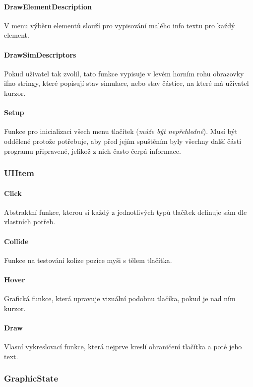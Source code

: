 \documentclass[a4paper, 12pt]{article}
\begin{document}
\paragraph{DrawElementDescription}
V menu výběru elementů slouží pro vypisování malého info textu pro každý
element.

\paragraph{DrawSimDescriptors}
Pokud uživatel tak zvolil, tato funkce vypisuje v levém horním rohu obrazovky
ifno stringy, které popisují stav simulace, nebo stav částice, na které má
uživatel kurzor.

\paragraph{Setup}
Funkce pro inicializaci všech menu tlačítek (\emph{může být nepřehledné}).
Musí být oddělené protože potřebuje, aby před jejím spuštěním byly všechny
další části programu připravené, jelikož z nich často čerpá informace.

\subsubsection{UIItem}
\paragraph{Click}
Abstraktní funkce, kterou si každý z jednotlivých typů tlačítek definuje sám
dle vlastních potřeb.

\paragraph{Collide}
Funkce na testování kolize pozice myši s tělem tlačítka.

\paragraph{Hover}
Grafická funkce, která upravuje vizuální podobnu tlačíka, pokud je nad ním
kurzor.

\paragraph{Draw}
Vlasní vykreslovací funkce, která nejprve kreslí ohraničení tlačítka a poté
jeho text.

\subsubsection{GraphicState}
\end{document}
